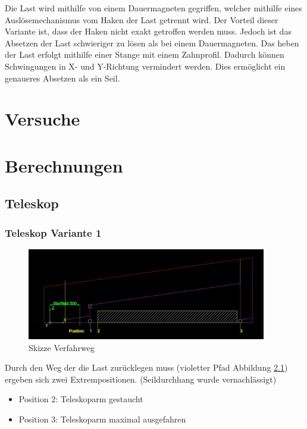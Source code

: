 \documentclass[a4paper]{report}
\begin{document}
Die Last wird mithilfe von einem Dauermagneten gegriffen, welcher mithilfe eines Auslösemechanismus vom Haken der Last getrennt wird. Der Vorteil dieser Variante ist, dass der Haken nicht exakt getroffen werden muss. Jedoch ist das Absetzen der Last schwieriger zu lösen als bei einem Dauermagneten. Das heben der Last erfolgt mithilfe einer Stange mit einem Zahnprofil. Dadurch können Schwingungen in X- und Y-Richtung vermindert werden. Dies ermöglicht ein genaueres Absetzen als ein Seil.

\chapter{Versuche}
\label{app:ch:Versuche}



\chapter{Berechnungen}
\label{app:ch:Berechnung}
\section{Teleskop}
\label{app:sec:Teleskjope}
\subsection{Teleskop Variante 1}
\label{app:ssec:TeleskopjeVar1}
\begin{figure}[h]
	\centering
	\includegraphics[keepaspectratio,height=4cm]{Teleskoparm1.JPG}
	\caption{Skizze Verfahrweg}
	\label{fig:Skizze Verfahrweg}
\end{figure}

Durch den Weg der die Last zurücklegen muss (violetter Pfad Abbildung \ref{fig:Skizze Verfahrweg}) ergeben sich zwei Extrempositionen.
(Seildurchhang wurde vernachlässigt)


\begin{itemize}[noitemsep]
	\item Position 2: Teleskoparm gestaucht
	\item Position 3: Teleskoparm maximal ausgefahren
\end{itemize}
\end{document}
